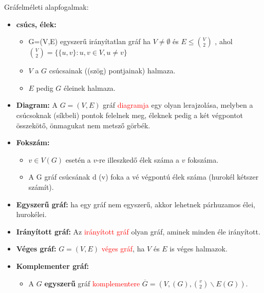 \documentclass[../../szobeli.tex]{subfiles}
\begin{document}
\begin{center}
    \noindent{}
\end{center}

    Gráfelméleti alapfogalmak: 

    \begin{itemize}
        \item \textbf{csúcs, élek:} \begin{itemize}
            \item G=(V,E) egyszerű irányítatlan gráf ha $V \neq \emptyset$ és $E \leq \binom{V}{2}$ , ahol $\binom{V}{2} = \{\{u,v\}:u,v\in V,u\neq v\}$
            \item $V$ a $G$ csúcsainak ((szög) pontjainak) halmaza.
            \item $E$ pedig $G$ éleinek halmaza.
        \end{itemize} 
        \item \textbf{Diagram:} A $G = (V,E)$ gráf \textcolor{red}{diagramja} egy olyan lerajzolása, melyben a csúcsoknak (síkbeli) pontok felelnek meg, éleknek pedig a két végpontot összekötő, önmagukat nem metsző görbék.
        \item \textbf{Fokszám:}\begin{itemize}
            \item $v \in V(G)$  esetén a $v$-re illeszkedő élek száma a $v$ fokszáma.
            \item A G gráf csúcsának d (v) foka a vé végpontú élek száma (hurokél kétszer számít).
        \end{itemize}
        \item \textbf{Egyszerű gráf:} ha egy gráf nem egyszerű, akkor lehetnek párhuzamos élei, hurokélei.
        \item \textbf{Irányított gráf:} Az \textcolor{red}{irányított gráf} olyan gráf, aminek minden éle irányított.
        \item \textbf{Véges gráf:} $G = (V,E)$ \textcolor{red}{véges gráf}, ha $V$ és $E$ is véges halmazok.
        \item \textbf{Komplementer gráf:} \begin{itemize}
            \item A $G$ \textbf{egyszerű} gráf \textcolor{red}{komplementere} $\overline{G} = (V,(G), \binom{v}{2} \backslash E(G))$.

\end{itemize}
\end{itemize}
\end{document}
